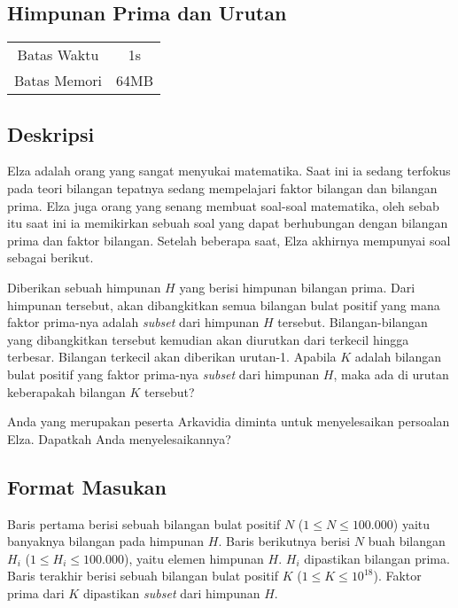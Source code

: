 \documentclass{article}
\begin{document}
\begin{center}
    \section*{Himpunan Prima dan Urutan} %

    \begin{tabular}{ | c c | }
        \hline
        Batas Waktu  & 1s \\    %
        Batas Memori & 64MB \\  %
        \hline
    \end{tabular}
\end{center}

\subsection*{Deskripsi}

Elza adalah orang yang sangat menyukai matematika. Saat ini ia sedang terfokus pada teori bilangan tepatnya 
sedang mempelajari faktor bilangan dan bilangan prima. Elza juga orang yang senang membuat soal-soal matematika, 
oleh sebab itu saat ini ia memikirkan sebuah soal yang dapat berhubungan dengan bilangan prima dan faktor bilangan. 
Setelah beberapa saat, Elza akhirnya mempunyai soal sebagai berikut.

Diberikan sebuah himpunan $H$ yang berisi himpunan bilangan prima. Dari himpunan tersebut, akan dibangkitkan 
semua bilangan bulat positif yang mana faktor prima-nya adalah \textit{subset} dari himpunan $H$ tersebut. 
Bilangan-bilangan yang dibangkitkan tersebut kemudian akan diurutkan dari terkecil hingga terbesar. Bilangan 
terkecil akan diberikan urutan-1. Apabila $K$ adalah bilangan bulat positif yang faktor prima-nya \textit{subset}
dari himpunan $H$, maka ada di urutan keberapakah bilangan $K$ tersebut?

Anda yang merupakan peserta Arkavidia diminta untuk menyelesaikan persoalan Elza. Dapatkah Anda menyelesaikannya?

\subsection*{Format Masukan}
Baris pertama berisi sebuah bilangan bulat positif $N$ ($1 \leq N \leq 100.000$) yaitu banyaknya bilangan pada
himpunan $H$. Baris berikutnya berisi $N$ buah bilangan $H_i$ ($1 \leq H_i \leq 100.000$), yaitu elemen himpunan $H$. $H_i$ dipastikan
bilangan prima. Baris terakhir berisi sebuah bilangan bulat positif $K$ ($1 \leq K \leq 10^{18}$). Faktor prima dari $K$ dipastikan
\textit{subset} dari himpunan $H$.
\end{document}
